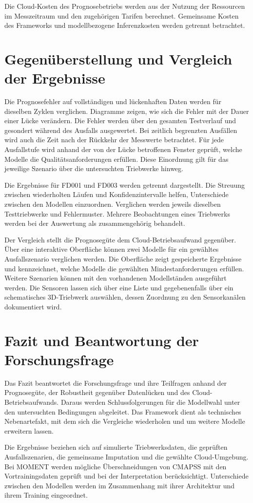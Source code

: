 Die Cloud-Kosten des Prognosebetriebs werden aus der Nutzung der Ressourcen im Messzeitraum und den zugehörigen Tarifen berechnet. Gemeinsame Kosten des Frameworks und modellbezogene Inferenzkosten werden getrennt betrachtet.

\section{Gegenüberstellung und Vergleich der Ergebnisse}

Die Prognosefehler auf vollständigen und lückenhaften Daten werden für dieselben Zyklen verglichen. Diagramme zeigen, wie sich die Fehler mit der Dauer einer Lücke verändern. Die Fehler werden über den gesamten Testverlauf und gesondert während des Ausfalls ausgewertet. Bei zeitlich begrenzten Ausfällen wird auch die Zeit nach der Rückkehr der Messwerte betrachtet. Für jede Ausfallstufe wird anhand der von der Lücke betroffenen Fenster geprüft, welche Modelle die Qualitätsanforderungen erfüllen. Diese Einordnung gilt für das jeweilige Szenario über die untersuchten Triebwerke hinweg.

Die Ergebnisse für FD001 und FD003 werden getrennt dargestellt. Die Streuung zwischen wiederholten Läufen und Konfidenzintervalle helfen, Unterschiede zwischen den Modellen einzuordnen. Verglichen werden jeweils dieselben Testtriebwerke und Fehlermuster. Mehrere Beobachtungen eines Triebwerks werden bei der Auswertung als zusammengehörig behandelt.

Der Vergleich stellt die Prognosegüte dem Cloud-Betriebsaufwand gegenüber. Über eine interaktive Oberfläche können zwei Modelle für ein gewähltes Ausfallszenario verglichen werden. Die Oberfläche zeigt gespeicherte Ergebnisse und kennzeichnet, welche Modelle die gewählten Mindestanforderungen erfüllen. Weitere Szenarien können mit den vorhandenen Modellständen ausgeführt werden. Die Sensoren lassen sich über eine Liste und gegebenenfalls über ein schematisches 3D-Triebwerk auswählen, dessen Zuordnung zu den Sensorkanälen dokumentiert wird.

\newpage
\section{Fazit und Beantwortung der Forschungsfrage}

Das Fazit beantwortet die Forschungsfrage und ihre Teilfragen anhand der Prognosegüte, der Robustheit gegenüber Datenlücken und des Cloud-Betriebsaufwands. Daraus werden Schlussfolgerungen für die Modellwahl unter den untersuchten Bedingungen abgeleitet. Das Framework dient als technisches Nebenartefakt, mit dem sich die Vergleiche wiederholen und um weitere Modelle erweitern lassen.

Die Ergebnisse beziehen sich auf simulierte Triebwerksdaten, die geprüften Ausfallszenarien, die gemeinsame Imputation und die gewählte Cloud-Umgebung. Bei MOMENT werden mögliche Überschneidungen von \ac{CMAPSS} mit den Vortrainingsdaten geprüft und bei der Interpretation berücksichtigt. Unterschiede zwischen den Modellen werden im Zusammenhang mit ihrer Architektur und ihrem Training eingeordnet.
